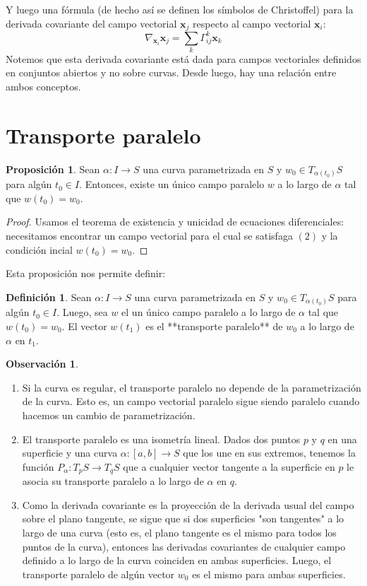 \documentclass[spanish]{book}
\theoremstyle{definition}
\newtheorem*{defn}{Definición}
\newtheorem*{prop}{Proposición}
\newtheorem*{obs}{Observación}
\begin{document}
Y luego una fórmula (de hecho así se definen los símbolos de Christoffel) para la derivada covariante del campo vectorial $\mathbf x_j$ respecto al campo vectorial $\mathbf x_i$:
\[\nabla_{\mathbf x_i}\mathbf x_j=\sum_{k}\Gamma^k_{ij}\mathbf x_k\]
Notemos que esta derivada covariante está dada para campos vectoriales definidos en conjuntos abiertos y no sobre curvas. Desde luego, hay una relación entre ambos conceptos.

\section{Transporte paralelo}
\begin{prop}
	Sean $\alpha:I\to S$ una curva parametrizada en $S$ y $w_0\in T_{\alpha(t_0)}S$  para algún $t_0\in I$. Entonces, existe un único campo paralelo $w$ a lo largo de $\alpha$ tal que $w(t_0)=w_0$.
\end{prop}
\begin{proof}
	Usamos el teorema de existencia y unicidad de ecuaciones diferenciales: necesitamos encontrar un campo vectorial para el cual se satisfaga $(2)$ y la condición incial $w(t_0)=w_0$.
\end{proof}
Esta proposición nos permite definir:
\begin{defn}
	Sean $\alpha:I\to S$ una curva parametrizada en $S$ y $w_0\in T_{\alpha(t_0)}S$  para algún $t_0\in I$. Luego, sea $w$ el un único campo paralelo a lo largo de $\alpha$ tal que $w(t_0)=w_0$. El vector $w(t_1)$ es el **transporte paralelo** de $w_0$ a lo largo de $\alpha$ en $t_1$.
\end{defn}
\begin{obs}
	\begin{enumerate}\leavevmode
		\item Si la curva es regular, el transporte paralelo no depende de la parametrización de la curva. Esto es, un campo vectorial paralelo sigue siendo paralelo cuando hacemos un cambio de parametrización.
		\item El transporte paralelo es una isometría lineal. Dados dos puntos $p$ y $q$ en una superficie y una curva $\alpha:[a,b]\to S$ que los une en sus extremos, tenemos la función $P_\alpha:T_pS\to T_qS$ que a cualquier vector tangente a la superficie en $p$ le asocia su transporte paralelo a lo largo de $\alpha$ en $q$.
		\item Como la derivada covariante es la proyección de la derivada usual del campo sobre el plano tangente, se sigue que si dos superficies "son tangentes" a lo largo de una curva (esto es, el plano tangente es el mismo para todos los puntos de la curva), entonces las derivadas covariantes de cualquier campo definido a lo largo de la curva coinciden en ambas superficies. Luego, el transporte paralelo de algún vector $w_0$ es el mismo para ambas superficies.
	\end{enumerate}
\end{obs}
\end{document}
